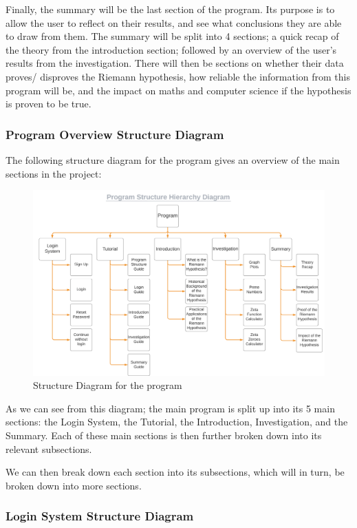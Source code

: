 \documentclass{article}
\begin{document}
Finally, the summary will be the last section of the program. Its purpose is to allow the user to reflect on their results, and see what conclusions they are able to draw from them. The summary will be split into 4 sections; a quick recap of the theory from the introduction section; followed by an overview of the user’s results from the investigation. There will then be sections on whether their data proves/ disproves the Riemann hypothesis, how reliable the information from this program will be, and the impact on maths and computer science if the hypothesis is proven to be true.
\clearpage
\subsubsection{Program Overview Structure Diagram}
The following structure diagram for the program gives an overview of the main sections in the project:

\begin{figure}[ht]
    \centering
    \captionsetup{justification=centering}
    \includegraphics[scale=0.095]{program-structure-hierarchy-diagram}
    \caption{Structure Diagram for the program}
\end{figure}

As we can see from this diagram; the main program is split up into its 5 main sections: the Login System, the Tutorial, the Introduction, Investigation, and the Summary. Each of these main sections is then further broken down into its relevant subsections.

We can then break down each section into its subsections, which will in turn, be broken down into more sections.
\clearpage
\subsubsection{Login System Structure Diagram}
\end{document}
